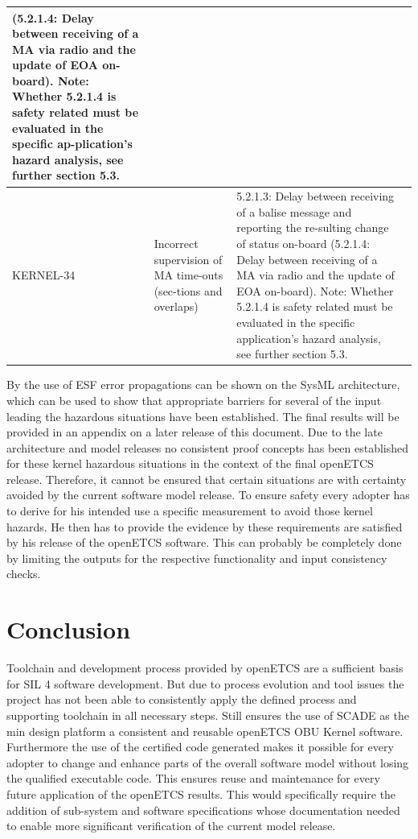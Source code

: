 \documentclass{template/openetcs_report}
\begin{document}
\begin{center}
\begin{supertabular}[t]{|p{2cm}|p{4cm}|p{4cm}|p{4cm}|}
(5.2.1.4: Delay between receiving of a MA via radio and the update of EOA on-board).
Note: Whether 5.2.1.4 is safety related must be evaluated in the specific ap-plication’s hazard analysis, see further section 5.3.  &  \\
\hline KERNEL-34 & Incorrect supervision of MA time-outs (sec-tions and overlaps) & 
5.2.1.3: Delay between receiving of a balise message and reporting the re-sulting change of status on-board
(5.2.1.4: Delay between receiving of a MA via radio and the update of EOA on-board).
Note: Whether 5.2.1.4 is safety related must be evaluated in the specific application’s hazard analysis, see further section 5.3.  &  \\
\end{supertabular} 
\end{center}

By the use of ESF error propagations can be shown on the SysML architecture, which can be used to show that appropriate barriers for several of the input leading the hazardous situations have been established. The final results will be provided in an appendix on a later release of this document.
Due to the late architecture and model releases no consistent proof concepts has been established for these kernel hazardous situations in the context of the final openETCS release. Therefore, it cannot be ensured that certain situations are with certainty avoided by the current software model release. To ensure safety  every adopter has to derive for his intended use a specific measurement to avoid those kernel hazards. He then has to provide the evidence by these requirements are satisfied by his release of the openETCS software. This can probably be completely done by limiting the outputs for the respective functionality and input consistency checks.


\chapter{Conclusion}
\label{sec:conclusion}

Toolchain and development process provided by openETCS are a sufficient basis for SIL 4 software development. But due to process evolution and tool issues the project has not been able to consistently apply the defined process and supporting toolchain in all necessary steps. Still ensures the use of SCADE as the min design platform a consistent and reusable openETCS OBU Kernel software. Furthermore the use of the certified code generated makes it possible for every adopter to change and enhance parts of the overall software model without losing the qualified executable code. This ensures reuse and maintenance for every future application of the openETCS results. This would specifically require the addition of sub-system and software specifications whose documentation needed to enable more significant verification of the current model release.
\end{document}
